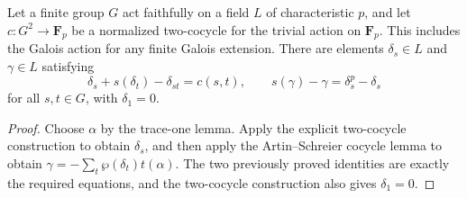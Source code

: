 \begin{theorem}
\label{thm:witt-additive-equations}
\leanok
Let a finite group $G$ act faithfully on a field $L$ of
characteristic $p$, and let $c:G^2\to\mathbf F_p$ be a normalized
two-cocycle for the trivial action on $\mathbf F_p$.
This includes the Galois action for any finite Galois extension.
There are elements $\delta_s\in L$ and $\gamma\in L$ satisfying
\[
 \delta_s+s(\delta_t)-\delta_{st}=c(s,t),\qquad
 s(\gamma)-\gamma=\delta_s^p-\delta_s
\]
for all $s,t\in G$, with $\delta_1=0$.
\end{theorem}

\begin{proof}
Choose $\alpha$ by the trace-one lemma. Apply the explicit
two-cocycle construction to obtain $\delta_s$, and then apply
the Artin--Schreier cocycle lemma to obtain
$\gamma=-\sum_t\wp(\delta_t)t(\alpha)$.
The two previously proved identities are exactly the required
equations, and the two-cocycle construction also gives
$\delta_1=0$.
\end{proof}
